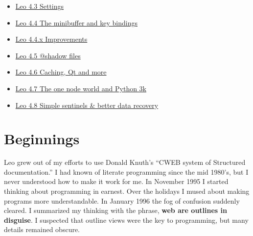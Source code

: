 \documentclass[a4paper,10pt,english]{sphinxmanual}
\begin{document}
{\begin{minipage}{0.95\linewidth}
\begin{itemize}
\begin{itemize}
\item {} 
{\hyperref[history:leo-4-3-settings]{Leo 4.3 Settings}}

\item {} 
{\hyperref[history:leo-4-4-the-minibuffer-and-key-bindings]{Leo 4.4 The minibuffer and key bindings}}

\item {} 
{\hyperref[history:leo-4-4-x-improvements]{Leo 4.4.x Improvements}}

\item {} 
{\hyperref[history:leo-4-5-shadow-files]{Leo 4.5 @shadow files}}

\item {} 
{\hyperref[history:leo-4-6-caching-qt-and-more]{Leo 4.6 Caching, Qt and more}}

\item {} 
{\hyperref[history:leo-4-7-the-one-node-world-and-python-3k]{Leo 4.7 The one node world and Python 3k}}

\item {} 
{\hyperref[history:leo-4-8-simple-sentinels-better-data-recovery]{Leo 4.8 Simple sentinels \& better data recovery}}

\end{itemize}

\end{itemize}
\end{minipage}}
\begin{center}\setlength{\fboxsep}{5pt}\end{center}


\section{Beginnings}
\label{history:beginnings}\label{history:opml}
Leo grew out of my efforts to use Donald Knuth's ``CWEB system of Structured
documentation.'' I had known of literate programming since the mid 1980's, but I
never understood how to make it work for me. In November 1995 I started thinking
about programming in earnest. Over the holidays I mused about making programs
more understandable. In January 1996 the fog of confusion suddenly cleared. I
summarized my thinking with the phrase, \textbf{web are outlines in disguise}. I
suspected that outline views were the key to programming, but many details
remained obscure.
\end{document}
